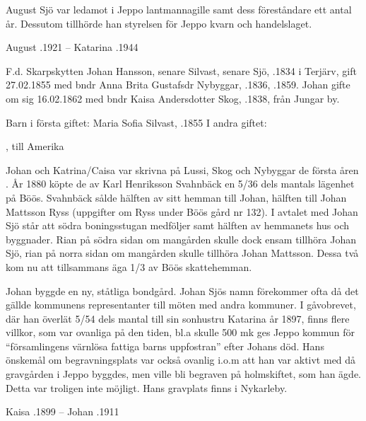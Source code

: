 August Sjö var ledamot i Jeppo lantmannagille samt dess föreståndare ett antal år. Dessutom tillhörde han styrelsen för Jeppo kvarn och  handelslaget.

August .1921  --  Katarina .1944


F.d. Skarpskytten Johan Hansson, senare Silvast, senare Sjö, .1834 i Terjärv, gift 27.02.1855 med bndr Anna Brita Gustafsdr Nybyggar, .1836, .1859. Johan gifte om sig 16.02.1862 med bndr Kaisa Andersdotter Skog, .1838, från Jungar by.

Barn i första giftet: Maria Sofia Silvast, .1855
I andra giftet:
\begin{jhchildren}
  \item {}
  \item {}, till Amerika
  \item {}
\end{jhchildren}
Johan och Katrina/Caisa var skrivna på Lussi, Skog och Nybyggar de första åren . År 1880 köpte de av Karl Henriksson Svahnbäck en 5/36 			dels mantals lägenhet på Böös. Svahnbäck sålde hälften av sitt hemman till Johan, hälften till Johan Mattsson Ryss (uppgifter om Ryss under Böös gård nr 132). I avtalet med Johan Sjö står att södra boningsstugan medföljer samt hälften av hemmanets hus och byggnader. Rian på södra sidan om mangården skulle dock ensam tillhöra Johan Sjö, rian på norra sidan om mangården skulle tillhöra Johan Mattsson. Dessa två kom nu att tillsammans äga 1/3 av Böös skattehemman.

Johan byggde en ny, ståtliga bondgård. Johan Sjös namn förekommer ofta då det gällde kommunens representanter till möten med andra kommuner. I gåvobrevet, där han överlät 5/54 dels mantal till sin sonhustru Katarina år 1897, finns flere villkor, som var ovanliga på den tiden, bl.a skulle 500 mk ges Jeppo kommun för ``församlingens värnlösa fattiga barns uppfostran'' efter Johans död. Hans önskemål om begravningsplats var också ovanlig i.o.m att han var aktivt med då gravgården i Jeppo byggdes, men ville bli begraven på holmskiftet, som han ägde. Detta var troligen inte möjligt. Hans gravplats finns i Nykarleby.

Kaisa .1899  --  Johan .1911


